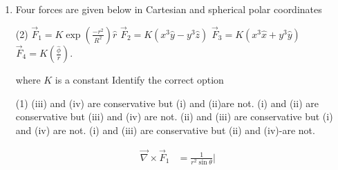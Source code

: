 \begin{enumerate}[label=\color{ocre}\textbf{\arabic*.}]
\begin{tasks}(2)
\task[\textbf{A.}] $10 \hat{i}-2 \hat{j}+5 \hat{k}$
\task[\textbf{B.}] $10 \hat{i}-6 \hat{j}-8 \hat{k}$
\task[\textbf{C.}]$10 \hat{i}+2 \hat{j}+5 \hat{k}$
\task[\textbf{D.}]$10 \hat{i}-2 \hat{j}-5 \hat{k}$
\end{tasks}
\begin{answer}
\begin{align*}
\text{Unit vector normal to } x+3 y-z=5 :\ \hat{n}_{1}&=\frac{\vec{\nabla} \phi}{|\vec{\nabla} \phi|}=\frac{\hat{i}+3 \hat{j}-\hat{k}}{\sqrt{1+9+1}}\\&=\frac{\hat{i}+3 \hat{j}-\hat{k}}{\sqrt{11}}\\
\text{Unit vector normal to } 2 x-2 y+4 z=3 :\ \hat{n}_{2}&=\frac{\vec{\nabla} \phi}{|\vec{\nabla} \phi|}=\frac{2 \hat{i}-2 \hat{j}+4 \hat{k}}{\sqrt{4+4+16}}\\&=\frac{2 \hat{i}-2 \hat{j}+4 \hat{k}}{\sqrt{24}}
\intertext{Let's check for option (B) }
\  \hat{n}&=10 \hat{i}-6 \hat{j}-8 \hat{k}\\
\hat{n}_{1} \cdot \hat{n}&=\frac{10-18+8}{\sqrt{11}}=0 \quad \\\hat{n}_{2} \cdot \hat{n}&=\frac{20+12-32}{\sqrt{24}}=0
\end{align*}
Correct option is (B)
\end{answer}
\item Four forces are given below in Cartesian and spherical polar coordinates
\begin{tasks}(2)
	\task[\textbf{i.}] $\vec{F}_{1}=K \exp \left(\frac{-r^{2}}{R^{2}}\right) \hat{r}$
	\task[\textbf{ii.}] $\vec{F}_{2}=K\left(x^{3} \hat{y}-y^{3} \hat{z}\right)$
	$\vec{F}_{3}=K\left(x^{3} \hat{x}+y^{3} \hat{y}\right)$
	\task[\textbf{iv.}]$\vec{F}_{4}=K\left(\frac{\hat{\phi}}{r}\right)$.
\end{tasks}
 where $K$ is a constant Identify the correct option
\begin{tasks}(1)
	\task[\textbf{A.}] (iii) and (iv) are conservative but (i) and (ii)are not.
	\task[\textbf{B.}] (i) and (ii) are conservative but (iii) and (iv) are not.
	\task[\textbf{C.}](ii) and (iii) are conservative but (i) and (iv) are not.
	\task[\textbf{D.}](i) and (iii) are conservative but (ii) and (iv)-are not. 
\end{tasks} 
\begin{answer}
	\begin{align*}
	\vec{\nabla} \times \vec{F}_{1}&=\frac{1}{r^{2} \sin \theta}\left|\begin{array}{ccc}

\end{array}
\end{align*}
\end{answer}
\end{enumerate}
